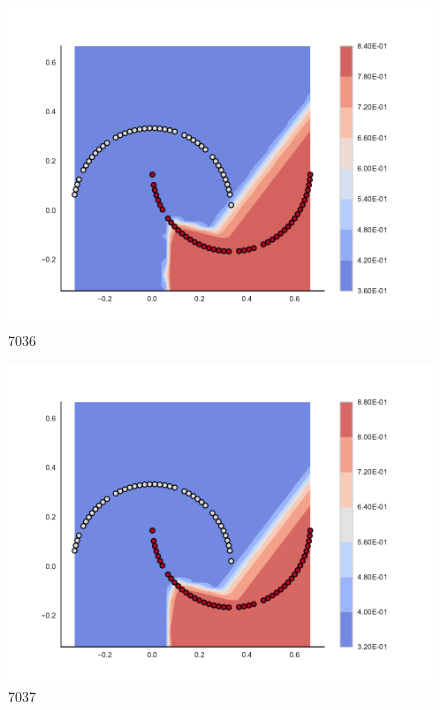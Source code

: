 \begin{subfigure}[b]{0.09\textwidth}
    \includegraphics[clip, trim=2.35cm 1.75cm 4.5cm 0cm,width=\textwidth]{img/convergence/7036.pdf}
    \caption{7036}
    \label{fig:convergence_7036}
\end{subfigure}
%
\begin{subfigure}[b]{0.09\textwidth}
    \includegraphics[clip, trim=2.35cm 1.75cm 4.5cm 0cm,width=\textwidth]{img/convergence/7037.pdf}
    \caption{7037}
    \label{fig:convergence_7037}
\end{subfigure}
%
